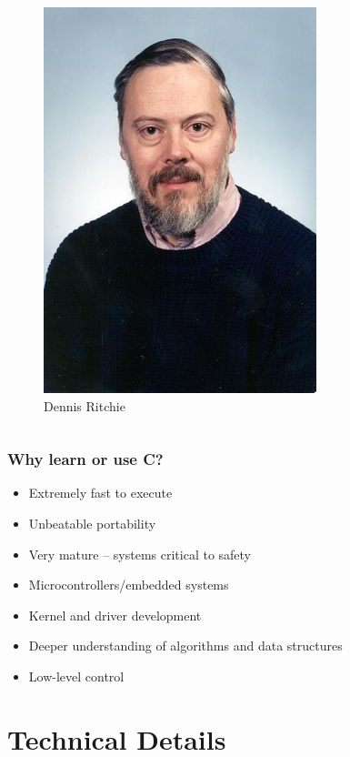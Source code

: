 \documentclass{beamer}
\begin{document}
\begin{frame}
\begin{columns}

        \begin{figure}
            \centering
            \includegraphics[scale=0.5]{dennisritchie.jpg}
            \caption*{Dennis Ritchie}
            \label{fig:ritch}
        \end{figure}
    \end{columns}
\end{frame}

\begin{frame}
    \frametitle{Why learn or use C?}
    \begin{itemize}[<+->]
        \item Extremely fast to execute
        \item Unbeatable portability
        \item Very mature -- systems critical to safety
        \item Microcontrollers/embedded systems
        \item Kernel and driver development
        \item Deeper understanding of algorithms and data structures
        \item Low-level control
    \end{itemize}
\end{frame}

\section{Technical Details}
\end{document}
